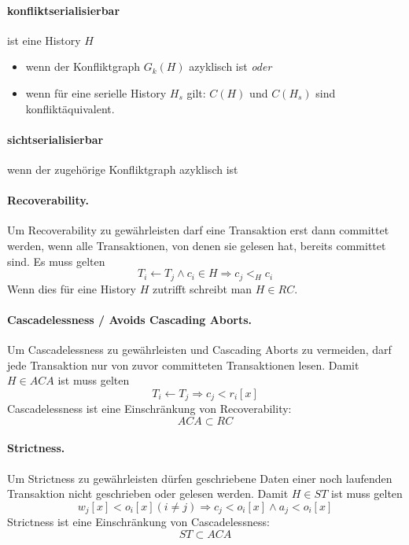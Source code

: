 \documentclass[]{scrartcl}
\begin{document}
\paragraph{konfliktserialisierbar } ist eine History $H$ 
\begin{itemize}
\item wenn der Konfliktgraph $G_{k}(H)$ azyklisch ist \emph{oder}
\item wenn f\"ur eine serielle History $H_{s}$ gilt: $C(H)$ und $C(H_{s})$ sind konflikt\"aquivalent.
\end{itemize}



\paragraph{sichtserialisierbar}

wenn der zugeh\"orige Konfliktgraph azyklisch ist


\paragraph{Recoverability.} Um Recoverability zu gew\"ahrleisten darf eine Transaktion erst dann committet werden, wenn alle Transaktionen, von denen sie gelesen hat, bereits committet sind. Es muss gelten
$$T_{i} \gets T_{j} \wedge c_{i} \in H \Rightarrow c_{j} <_{H} c_{i}$$
Wenn dies f\"ur eine History $H$ zutrifft schreibt man $H \in RC$.

\paragraph{Cascadelessness / Avoids Cascading Aborts.} Um Cascadelessness zu gew\"ahrleisten und Cascading Aborts zu vermeiden, darf jede Transaktion nur von zuvor committeten Transaktionen lesen. Damit $H \in ACA$ ist muss gelten
$$T_{i} \gets T_{j} \Rightarrow c_{j} < r_{i}[x]$$
Cascadelessness ist eine Einschr\"ankung von Recoverability:
$$ACA \subset RC$$

\paragraph{Strictness.} Um Strictness zu gew\"ahrleisten d\"urfen geschriebene Daten einer noch laufenden Transaktion nicht geschrieben oder gelesen werden. Damit $H \in ST$ ist muss gelten
$$w_{j}[x] < o_{i}[x] (i \neq j) \Rightarrow c_{j} < o_{i}[x] \wedge a_{j} < o_{i}[x]$$
Strictness ist eine Einschr\"ankung von Cascadelessness:
$$ST \subset ACA$$
\end{document}
